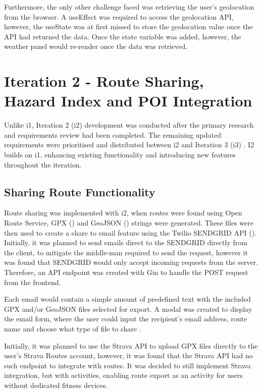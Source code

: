 Furthermore, the only other challenge faced was retrieving the user's geolocation from the browser. A useEffect was required to access the geolocation API, however, the useState was at first missed to store the geolocation value once the API had returned the data. Once the state variable was added, however, the weather panel would re-render once the data was retrieved.

\section{Iteration 2 - Route Sharing, Hazard Index and POI Integration}
\label{implementation:iteration2}

Unlike i1, Iteration 2 (i2) development was conducted after the primary research and requirements review had been completed. The remaining updated requirements were prioritised and distributed between i2 and Iteration 3 (i3) . I2 builds on i1, enhancing existing functionality and introducing new features throughout the iteration. 

\subsection{Sharing Route Functionality}
\label{iteration2:sharing-route}

Route sharing was implemented with i2, when routes were found using Open Route Service, GPX (\cite{noauthor_gpx_nodate}) and GeoJSON (\cite{noauthor_geojson_nodate}) strings were generated. These files were then used to create a share to email feature using the Twilio SENDGRID API (\cite{noauthor_email_nodate}). Initially, it was planned to send emails direct to the SENDGRID directly from the client, to mitigate the middle-man required to send the request, however it was found that SENDGRID would only accept incoming requests from the server. Therefore, an API endpoint was created with Gin to handle the POST request from the frontend. 

Each email would contain a simple amount of predefined text with the included GPX and/or GeoJSON files selected for export. A modal was created to display the email form, where the user could input the recipient's email address, route name and choose what type of file to share .

Initially, it was planned to use the Strava API to upload GPX files directly to the user's Strava Routes account, however, it was found that the Strava API had no such endpoint to integrate with routes. It was decided to still implement Strava integration, but with activities, enabling route export as an activity for users without dedicated fitness devices. 


